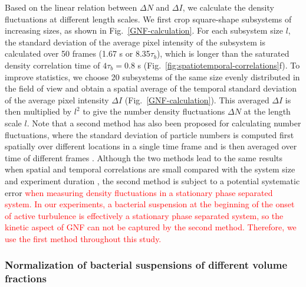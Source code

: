 \documentclass[twocolumn,aps,prx,amsmath,amssymb,longbibliography,superscriptaddress]{revtex4-2}
\begin{document}
Based on the linear relation between $\Delta N$ and $\Delta I$, we calculate the density fluctuations at different length scales. We first crop square-shape subsystems of increasing sizes, as shown in Fig.~\ref{GNF-calculation}. For each subsystem size $l$, the standard deviation of the average pixel intensity of the subsystem is calculated over 50 frames (1.67 s or 8.35$\tau_b$), which is longer than the saturated density correlation time of $4\tau_b = 0.8$ s (Fig.~\ref{fig:spatiotemporal-correlations}f). To improve statistics, we choose 20 subsystems of the same size evenly distributed in the field of view and obtain a spatial average of the temporal standard deviation of the average pixel intensity $\Delta I$ (Fig.~\ref{GNF-calculation}). This averaged $\Delta I$ is then multiplied by $l^2$ to give the number density fluctuations $\Delta N$ at the length scale $l$. Note that a second method has also been proposed for calculating number fluctuations, where the standard deviation of particle numbers is computed first spatially over different locations in a single time frame and is then averaged over time of different frames \cite{Aranson2008}.  Although the two methods lead to the same results when spatial and temporal correlations are small compared with the system size and experiment duration \cite{Aranson2008}, the second method is subject to a potential systematic error \textcolor{red}{when measuring density fluctuations in a stationary phase separated system. In our experiments, a bacterial suspension at the beginning of the onset of active turbulence is effectively a stationary phase separated system, so the kinetic aspect of GNF can not be captured by the second method. Therefore, we use the first method throughout this study.}


\subsubsection{Normalization of bacterial suspensions of different volume fractions}
\end{document}
